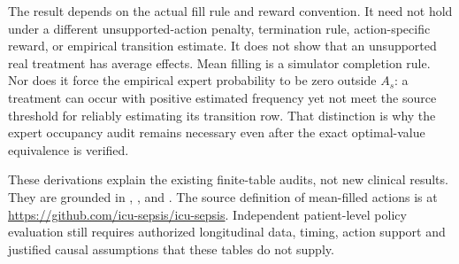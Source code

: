 The result depends on the actual fill rule and reward convention. It need not hold under a different unsupported-action penalty, termination rule, action-specific reward, or empirical transition estimate. It does not show that an unsupported real treatment has average effects. Mean filling is a simulator completion rule. Nor does it force the empirical expert probability to be zero outside $A_s$: a treatment can occur with positive estimated frequency yet not meet the source threshold for reliably estimating its transition row. That distinction is why the expert occupancy audit remains necessary even after the exact optimal-value equivalence is verified.

These derivations explain the existing finite-table audits, not new clinical results. They are grounded in , ,  and . The source definition of mean-filled actions is at \url{https://github.com/icu-sepsis/icu-sepsis}. Independent patient-level policy evaluation still requires authorized longitudinal data, timing, action support and justified causal assumptions that these tables do not supply.
